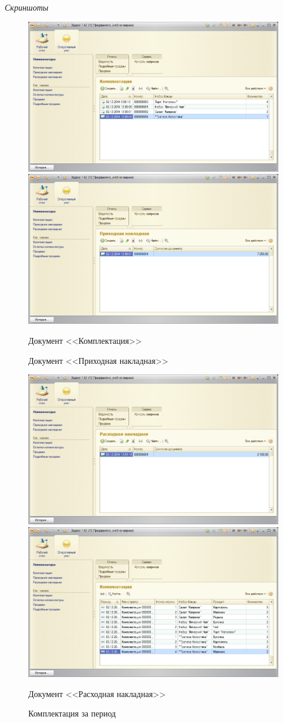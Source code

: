 \documentclass[12pt,pscyr]{hedlab}
\begin{document}
  \emph{Скриншоты}
  \begin{figure}[h!]
    \includegraphics[width=.5\textwidth]{1c_1}
    \includegraphics[width=.5\textwidth]{1c_2}\\
    \parbox{.5\textwidth}{\caption{Документ <<Комплектация>>}}
    \parbox{.5\textwidth}{\caption{Документ <<Приходная накладная>>}}
  \end{figure}
  
  \pagebreak
  
  \begin{figure}[h!]
    \includegraphics[width=.5\textwidth]{1c_3}
    \includegraphics[width=.5\textwidth]{1c_4}\\
    \parbox{.5\textwidth}{\caption{Документ <<Расходная накладная>>}}
    \parbox{.5\textwidth}{\caption{Комплектация за период}}
  \end{figure}
  
\end{document}
